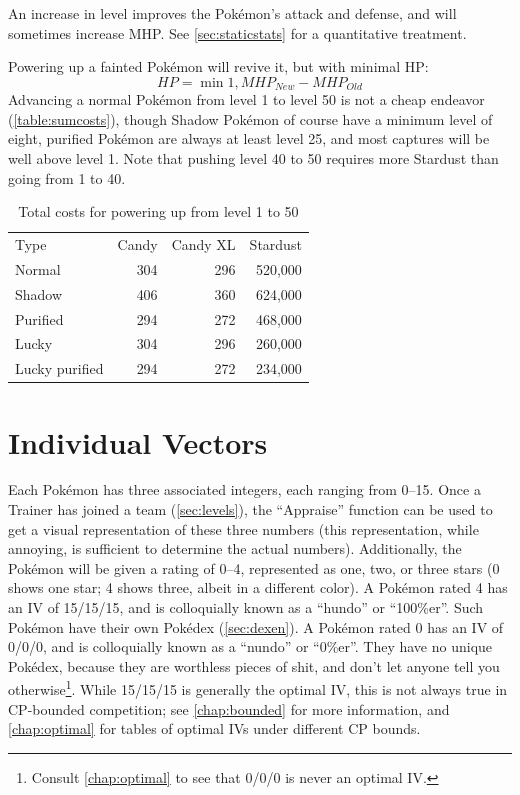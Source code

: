 An increase in level improves the Pokémon's attack and defense, and
  will sometimes increase MHP\@.
See \autoref{sec:staticstats} for a quantitative treatment.

Powering up a fainted Pokémon will revive it, but with minimal HP\@:
\[ HP = \min{1, MHP_{New} - MHP_{Old} } \]
Advancing a normal Pokémon from level 1 to level 50 is not a cheap endeavor (\autoref{table:sumcosts}),
  though Shadow Pokémon of course have a minimum level of eight, purified Pokémon are always
  at least level 25, and most captures will be well above level 1.
Note that pushing level 40 to 50 requires more Stardust than going from 1 to 40.
\begin{table}[ht]
\centering
\begin{tabular}{lrrr}
  Type & Candy & Candy XL & Stardust\\
\Midrule
        Normal & 304 & 296 & 520,000\\
        Shadow & 406 & 360 & 624,000\\
      Purified & 294 & 272 & 468,000\\
         Lucky & 304 & 296 & 260,000\\
Lucky purified & 294 & 272 & 234,000\\
\end{tabular}
\caption{Total costs for powering up from level 1 to 50}
\label{table:sumcosts}
\end{table}

\section{Individual Vectors}
\label{sec:ivs}
Each Pokémon has three associated integers, each ranging from 0--15.
Once a Trainer has joined a team (\autoref{sec:levels}), the ``Appraise'' function can be used to
  get a visual representation of these three numbers (this representation,
  while annoying, is sufficient to determine the actual numbers).
Additionally, the Pokémon will be given a rating of 0--4, represented as
  one, two, or three stars (0 shows one star; 4 shows three, albeit in a different color).
A Pokémon rated 4 has an IV of 15/15/15, and is colloquially known as a ``hundo'' or ``100\%er''.
Such Pokémon have their own Pokédex (\autoref{sec:dexen}).
A Pokémon rated 0 has an IV of 0/0/0, and is colloquially known as a ``nundo'' or ``0\%er''.
They have no unique Pokédex, because they are worthless pieces of shit,
  and don't let anyone tell you otherwise\footnote{Consult \autoref{chap:optimal}
  to see that 0/0/0 is never an optimal IV.}.
While 15/15/15 is generally the optimal IV, this is not always true in CP-bounded
  competition; see \autoref{chap:bounded} for more information,
  and \autoref{chap:optimal} for tables of optimal IVs under different CP bounds.

